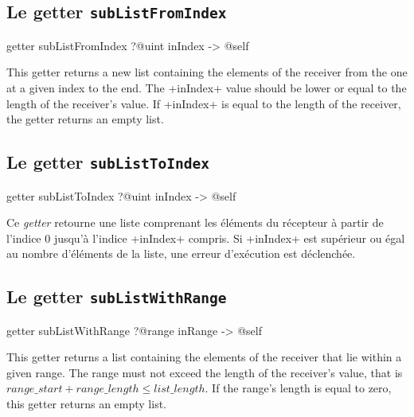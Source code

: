 \subsection{Le getter \texttt{subListFromIndex}}

\begin{galgas}
getter subListFromIndex ?@uint inIndex -> @self
\end{galgas}

This getter returns a new list containing the elements of the receiver from the one at a given index to the end. The  \ggs+inIndex+ value should be lower or equal to the length of the receiver's value. If \ggs+inIndex+ is equal to the length of the receiver, the getter returns an empty list.






\subsection{Le getter \texttt{subListToIndex}}

\begin{galgas}
getter subListToIndex ?@uint inIndex -> @self
\end{galgas}

Ce \emph{getter} retourne une liste comprenant les éléments du récepteur à partir de l'indice $0$ jusqu'à l'indice \ggs+inIndex+ compris. Si \ggs+inIndex+ est supérieur ou égal au nombre d'éléments de la liste, une erreur d'exécution est déclenchée.




\subsection{Le getter \texttt{subListWithRange}}

\begin{galgas}
getter subListWithRange
  ?@range inRange
  -> @self
\end{galgas}

This getter returns a list containing the elements of the receiver that lie within a given range. The range must not exceed the length of the receiver's value, that is $range\_start + range\_length \leqslant list\_length$. If the range's length is equal to zero, this getter returns an empty list.















